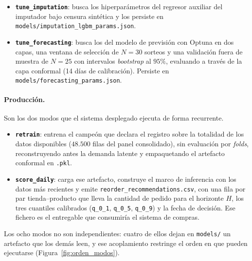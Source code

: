 \begin{itemize}
    \item \textbf{\texttt{tune\_imputation}}: busca los hiperparámetros del regresor auxiliar del imputador bajo censura sintética y los persiste en \texttt{models/}\allowbreak\texttt{imputation\_}\allowbreak\texttt{lgbm\_}\allowbreak\texttt{params.json}.
    \item \textbf{\texttt{tune\_forecasting}}: busca los del modelo de previsión con Optuna en dos capas, una ventana de selección de $N=30$ sorteos y una validación fuera de muestra de $N=25$ con intervalos \textit{bootstrap} al $95\%$, evaluando a través de la capa conformal (14 días de calibración). Persiste en \texttt{models/}\allowbreak\texttt{forecasting\_}\allowbreak\texttt{params.json}.
\end{itemize}

\paragraph{Producción.} Son los dos modos que el sistema desplegado ejecuta de forma recurrente.

\begin{itemize}
    \item \textbf{\texttt{retrain}}: entrena el campeón que declara el registro sobre la totalidad de los datos disponibles ($48.500$ filas del panel consolidado), sin evaluación por \textit{folds}, reconstruyendo antes la demanda latente y empaquetando el artefacto conformal en \texttt{.pkl}.
    \item \textbf{\texttt{score\_daily}}: carga ese artefacto, construye el marco de inferencia con los datos más recientes y emite \texttt{reorder\_}\allowbreak\texttt{recommendations.csv}, con una fila por par tienda--producto que lleva la cantidad de pedido para el horizonte $H$, los tres cuantiles calibrados (\texttt{q\_0\_1}, \texttt{q\_0\_5}, \texttt{q\_0\_9}) y la fecha de decisión. Ese fichero es el entregable que consumiría el sistema de compras.
\end{itemize}

Los ocho modos no son independientes: cuatro de ellos dejan en \texttt{models/} un artefacto que los demás leen, y ese acoplamiento restringe el orden en que pueden ejecutarse (Figura~\ref{fig:orden_modos}).

